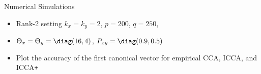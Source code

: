 \documentclass[8pt]{beamer}
\newcommand{\Pxy}{P_{xy}}
\newcommand{\kx}{k_x}
\newcommand{\ky}{k_y}
\newcommand{\Tx}{\Theta_x}
\newcommand{\Ty}{\Theta_y}
\newcommand{\iccaps}{ICCA\texttt{+}}
\begin{document}
\begin{frame}{Numerical Simulations}

\begin{itemize}
\item Rank-2 setting $\kx=\ky=2$, $p=200$, $q=250$, 
\item $\Tx=\Ty=\diag(16,4)$,  $\Pxy=\diag(0.9,0.5)$ 
\item Plot the accuracy of the first canonical vector for empirical CCA, ICCA, and \iccaps
\end{itemize}

\begin{figure}
\end{figure}


\end{frame}
\end{document}
